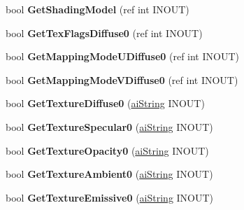 \begin{DoxyCompactItemize}
\item 
\hypertarget{classai_material_aabdb0c58422ca7473467ff8c72955896}{bool {\bfseries Get\+Shading\+Model} (ref int I\+N\+O\+U\+T)}\label{classai_material_aabdb0c58422ca7473467ff8c72955896}

\item 
\hypertarget{classai_material_a036bbd99f08d080fa3e6ab53ad518807}{bool {\bfseries Get\+Tex\+Flags\+Diffuse0} (ref int I\+N\+O\+U\+T)}\label{classai_material_a036bbd99f08d080fa3e6ab53ad518807}

\item 
\hypertarget{classai_material_a44267e0e5e1b89e6636f8219969596b2}{bool {\bfseries Get\+Mapping\+Mode\+U\+Diffuse0} (ref int I\+N\+O\+U\+T)}\label{classai_material_a44267e0e5e1b89e6636f8219969596b2}

\item 
\hypertarget{classai_material_aebda472a5473bf9b0e65accf5144e054}{bool {\bfseries Get\+Mapping\+Mode\+V\+Diffuse0} (ref int I\+N\+O\+U\+T)}\label{classai_material_aebda472a5473bf9b0e65accf5144e054}

\item 
\hypertarget{classai_material_a911042fa1b508e2eed8779c4cc0e7522}{bool {\bfseries Get\+Texture\+Diffuse0} (\hyperlink{structai_string}{ai\+String} I\+N\+O\+U\+T)}\label{classai_material_a911042fa1b508e2eed8779c4cc0e7522}

\item 
\hypertarget{classai_material_a7316a029ee3bcda69597fa77dd8ea0f4}{bool {\bfseries Get\+Texture\+Specular0} (\hyperlink{structai_string}{ai\+String} I\+N\+O\+U\+T)}\label{classai_material_a7316a029ee3bcda69597fa77dd8ea0f4}

\item 
\hypertarget{classai_material_a3bee9e8a592cf56ac16c6056a3908f7f}{bool {\bfseries Get\+Texture\+Opacity0} (\hyperlink{structai_string}{ai\+String} I\+N\+O\+U\+T)}\label{classai_material_a3bee9e8a592cf56ac16c6056a3908f7f}

\item 
\hypertarget{classai_material_acb2fb27bc580601d577662cdf00e5cbe}{bool {\bfseries Get\+Texture\+Ambient0} (\hyperlink{structai_string}{ai\+String} I\+N\+O\+U\+T)}\label{classai_material_acb2fb27bc580601d577662cdf00e5cbe}

\item 
\hypertarget{classai_material_ac7b961a24e29b23c8e2507faa92ffbd3}{bool {\bfseries Get\+Texture\+Emissive0} (\hyperlink{structai_string}{ai\+String} I\+N\+O\+U\+T)}\label{classai_material_ac7b961a24e29b23c8e2507faa92ffbd3}


\end{DoxyCompactItemize}
